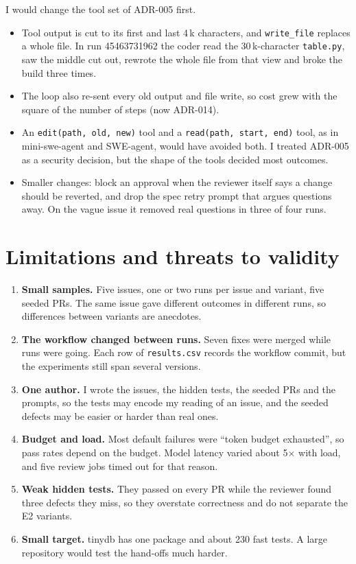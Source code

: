 \documentclass[11pt,a4paper]{article}
\newcommand{\code}[1]{\texttt{#1}}
\begin{document}
I would change the tool set of ADR-005 first.
\begin{itemize}
  \item Tool output is cut to its first and last 4\,k characters, and \code{write\_file} replaces a whole
        file. In run 45463731962 the coder read the 30\,k-character \code{table.py}, saw the middle cut out,
        rewrote the whole file from that view and broke the build three times.
  \item The loop also re-sent every old output and file write, so cost grew with the square of the number
        of steps (now ADR-014).
  \item An \code{edit(path, old, new)} tool and a \code{read(path, start, end)} tool, as in mini-swe-agent
        and SWE-agent, would have avoided both. I treated ADR-005 as a security decision, but the shape of
        the tools decided most outcomes.
  \item Smaller changes: block an approval when the reviewer itself says a change should be reverted, and
        drop the spec retry prompt that argues questions away. On the vague issue it removed real questions
        in three of four runs.
\end{itemize}

\section{Limitations and threats to validity}
\begin{enumerate}
  \item \textbf{Small samples.} Five issues, one or two runs per issue and variant, five seeded PRs. The same
        issue gave different outcomes in different runs, so differences between variants are anecdotes.
  \item \textbf{The workflow changed between runs.} Seven fixes were merged while runs were going. Each row
        of \code{results.csv} records the workflow commit, but the experiments still span several versions.
  \item \textbf{One author.} I wrote the issues, the hidden tests, the seeded PRs and the prompts, so the
        tests may encode my reading of an issue, and the seeded defects may be easier or harder than real ones.
  \item \textbf{Budget and load.} Most default failures were ``token budget exhausted'', so pass rates depend
        on the budget. Model latency varied about 5$\times$ with load, and five review jobs timed out for
        that reason.
  \item \textbf{Weak hidden tests.} They passed on every PR while the reviewer found three defects they miss,
        so they overstate correctness and do not separate the E2 variants.
  \item \textbf{Small target.} tinydb has one package and about 230 fast tests. A large repository would test
        the hand-offs much harder.
\end{enumerate}
\end{document}
